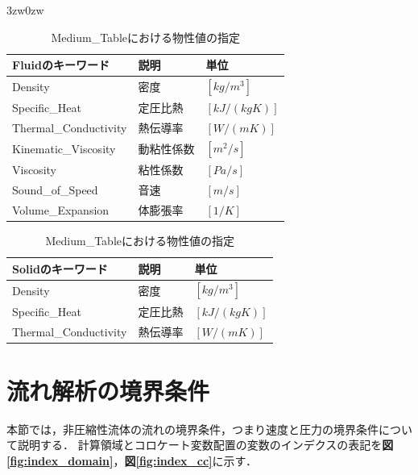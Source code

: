 \begin{indentation}{3zw}{0zw}
\begin{table}[htdp]
\small
\caption{Medium\_Tableにおける物性値の指定}
\begin{minipage}{.45\textwidth}
\begin{center}
\begin{tabular}{lll}\\ \toprule
Fluidのキーワード & 説明 & 単位\\ \midrule
Density & 密度 & $[kg/m^3]$\\
Specific\_Heat & 定圧比熱 & $[kJ/(kg K)]$\\
Thermal\_Conductivity & 熱伝導率 & $[W/(m K)]$\\
Kinematic\_Viscosity & 動粘性係数 & $[m^2/s]$\\
Viscosity & 粘性係数 & $[Pa/s]$\\
Sound\_of\_Speed & 音速 & $[m/s]$\\
Volume\_Expansion & 体膨張率 & $[1/K]$\\ \bottomrule
\end{tabular}
\end{center}
\end{minipage} \hfill
\begin{minipage}{.45\textwidth}
\begin{center}
\begin{tabular}{lll}\\ \toprule
Solidのキーワード & 説明 & 単位\\ \midrule
Density & 密度 & $[kg/m^3]$\\
Specific\_Heat & 定圧比熱 & $[kJ/(kg K)]$\\
Thermal\_Conductivity & 熱伝導率 & $[W/(m K)]$\\ \bottomrule
\end{tabular}
\end{center}
\end{minipage}
\label{tbl:material description}
\end{table}

\end{indentation}

\pagebreak
%
\section{流れ解析の境界条件}
\label{sec:flow_condition}
本節では，非圧縮性流体の流れの境界条件，つまり速度と圧力の境界条件について説明する．
計算領域とコロケート変数配置の変数のインデクスの表記を\textbf{図\ref{fig:index_domain}}，\textbf{図\ref{fig:index_cc}}に示す．

